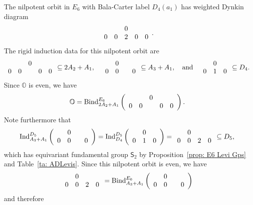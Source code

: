 \documentclass[11pt]{amsart}
\renewcommand{\O}{{\mathbb O}}
\newcommand{\Sym}{{\mathsf{S}}}
\newcommand{\Ind}{{{\mbox{\rm Ind}}}}
\newcommand{\BInd}{{{\mbox{\rm Bind}}}}
\numberwithin{equation}{section}
\begin{document}
	The nilpotent orbit in $E_6$ with Bala-Carter label $D_4(a_1)$ has weighted Dynkin diagram
	$$\begin{array}{c c c c c}
		& & 0 & & \\
		0 & 0 & 2 & 0 & 0 \\
	\end{array}.$$
	The rigid induction data for this nilpotent orbit are 
	$$\begin{array}{c c c c c}
		& & 0 & & \\
		0 & 0 &  & 0 & 0 \\
	\end{array}\subseteq 2A_2+A_1,\quad \begin{array}{c c c c}
		& 0 & & \\
		0 & 0 &  & 0 \\
	\end{array}\subseteq A_3+A_1,\quad\mbox{and}\quad \begin{array}{c c c}
		& 0 & \\
		0 & 1 & 0  \\
	\end{array}\subseteq D_4.$$
	Since $\O$ is even, we have $$\O=\BInd_{2 A_2 + A_1}^{E_6}\left(\begin{array}{c c c c c}
		& & 0 & & \\
		0 & 0 &  & 0 & 0 \\
	\end{array}\right).$$
	Note furthermore that $$\Ind_{A_3 + A_1}^{D_5}\left(\begin{array}{c c c c}
		& 0 & & \\
		0 & 0 &  & 0 \\
	\end{array}\right)=\Ind_{D_4}^{D_5}\left(\begin{array}{c c c}
		& 0 & \\
		0 & 1 & 0  \\
	\end{array}\right)=\begin{array}{c c c c}
		& 0 & & \\
		0 & 0 & 2 & 0 \\
	\end{array}\subseteq D_5,$$ which has equivariant fundamental group $\Sym_2$ by Proposition~\ref{prop: E6 Levi Gps} and Table~\ref{ta: ADLevis}. Since this nilpotent orbit is even, we have $$\begin{array}{c c c c}
		& 0 & & \\
		0 & 0 & 2 & 0 \\
	\end{array}=\BInd_{A_3 + A_1}^{E_6}\left(\begin{array}{c c c c}
		& 0 & & \\
		0 & 0 &  & 0 \\
	\end{array}\right)$$ and therefore
\end{document}
